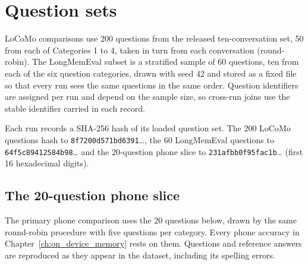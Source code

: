 \section{Question sets}
\label{app:repro_questions}

LoCoMo comparisons use 200 questions from the released ten-conversation set, 50 from each of
Categories 1 to 4, taken in turn from each conversation (round-robin). The
LongMemEval subset is a stratified sample of 60 questions, ten from each of the six question
categories, drawn with seed 42 and stored as a fixed file so that every run sees the same
questions in the same order. Question identifiers are assigned per run and depend on the
sample size, so cross-run joins use the stable identifier carried in each record.

Each run records a SHA-256 hash of its loaded question set. The 200 LoCoMo questions hash to
\texttt{8f7200d571bd6391}\ldots, the 60 LongMemEval questions to \texttt{64f5c89412584b98}\ldots{}
and the 20-question phone slice to \texttt{231afbb0f95fac1b}\ldots{} (first 16 hexadecimal digits).

\subsection*{The 20-question phone slice}

The primary phone comparison uses the 20 questions below, drawn by the same round-robin procedure
with five questions per category. Every phone accuracy in Chapter~\ref{ch:on_device_memory} rests
on them. Questions and reference answers are reproduced as they appear in the dataset, including
its spelling errors.

